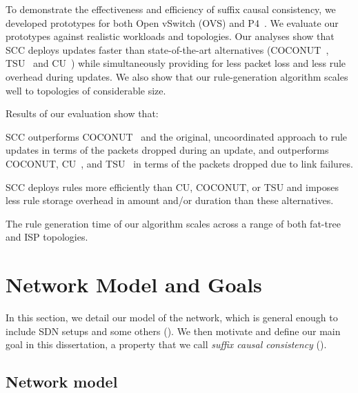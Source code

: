 To demonstrate the effectiveness and efficiency of suffix causal
consistency, we developed prototypes for both Open vSwitch (OVS) and
P4~\cite{P4Switch}.  We evaluate our prototypes against realistic
workloads and topologies. Our analyses show that SCC deploys updates
faster than state-of-the-art alternatives (COCONUT~\cite{COCONUT}, TSU~\cite{tsu} and
CU~\cite{CU}) while simultaneously providing for less packet loss and
less rule overhead during updates.  We also show that our
rule-generation algorithm scales well to topologies of considerable
size.

Results of our evaluation show that:
\begin {enumerate*}
\item SCC outperforms COCONUT~\cite{COCONUT} and the original, uncoordinated approach to
rule updates in terms of the packets dropped during an update, and outperforms COCONUT,
CU~\cite{CU}, and TSU~\cite{tsu} in terms of the packets dropped due
to link failures.

\item SCC deploys rules more efficiently than CU, COCONUT, or
TSU and imposes less rule storage overhead in amount and/or duration than these alternatives.

\item The rule generation time of our algorithm scales across a range
of both fat-tree and ISP topologies.

\end {enumerate*}


\section{Network Model and Goals}
\label{sec:model}

In this section, we detail our model of the network, which is general
enough to include SDN setups and some others ().
We then motivate and define our main goal in this dissertation, a property
that we call \textit{suffix causal consistency}
().

\subsection{Network model}
\label{sec:model:net}

